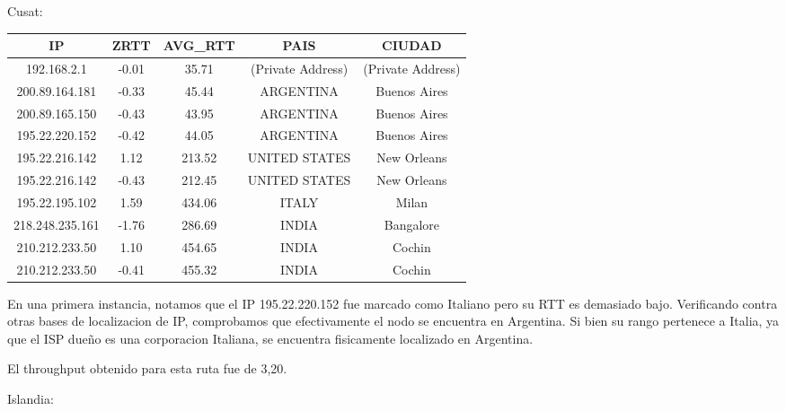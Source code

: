Cusat:

\begin{tabular}{|c@{\hspace{5ex}}c@{\hspace{5ex}}c@{\hspace{5ex}}c@{\hspace{5ex}}c|}
 \hline
 \rule{0pt}{1.2em}IP & ZRTT & AVG\_RTT & PAIS & CIUDAD\\[0.2em]
 \hline

\rule{0pt}{1.2em} 192.168.2.1  &  -0.01 & 35.71 & (Private Address) & (Private Address) \\[0.2em]
\rule{0pt}{1.2em} 200.89.164.181  &  -0.33 & 45.44 & ARGENTINA & Buenos Aires \\[0.2em]
\rule{0pt}{1.2em} 200.89.165.150  &  -0.43 & 43.95 & ARGENTINA & Buenos Aires \\[0.2em]
\rule{0pt}{1.2em} 195.22.220.152  &  -0.42 & 44.05 & ARGENTINA & Buenos Aires \\[0.2em]
\rule{0pt}{1.2em} 195.22.216.142  &  1.12 & 213.52 & UNITED STATES & New Orleans \\[0.2em]
\rule{0pt}{1.2em} 195.22.216.142  &  -0.43 & 212.45 & UNITED STATES & New Orleans \\[0.2em]
\rule{0pt}{1.2em} 195.22.195.102  &  1.59 & 434.06 & ITALY & Milan \\[0.2em]
\rule{0pt}{1.2em} 218.248.235.161  &  -1.76 & 286.69 & INDIA & Bangalore \\[0.2em]
\rule{0pt}{1.2em} 210.212.233.50  &  1.10 & 454.65 & INDIA & Cochin \\[0.2em]
\rule{0pt}{1.2em} 210.212.233.50  &  -0.41 & 455.32 & INDIA & Cochin \\[0.2em]
\hline
 \end{tabular}

 En una primera instancia, notamos que el IP 195.22.220.152 fue marcado como Italiano pero su RTT es demasiado bajo. Verificando contra otras bases de localizacion de IP, comprobamos que efectivamente el nodo se encuentra en Argentina. Si bien su rango pertenece a Italia, ya que el ISP dueño es una corporacion Italiana, se encuentra fisicamente localizado en Argentina.

El throughput obtenido para esta ruta fue de 3,20.

\medskip

Islandia:


